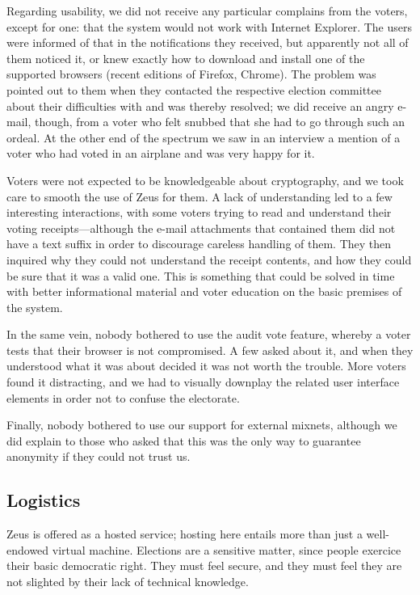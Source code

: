 \documentclass[letterpaper,10pt]{article}
\begin{document}
Regarding usability, we did not receive any particular complains from
the voters, except for one: that the system would not work with
Internet Explorer. The users were informed of that in the
notifications they received, but apparently not all of them noticed
it, or knew exactly how to download and install one of the supported
browsers (recent editions of Firefox, Chrome). The problem was pointed
out to them when they contacted the respective election committee
about their difficulties with and was thereby resolved; we did receive
an angry e-mail, though, from a voter who felt snubbed that she had
to go through such an ordeal. At the other end of the spectrum we saw
in an interview a mention of a voter who had voted in an airplane and
was very happy for it.

Voters were not expected to be knowledgeable about cryptography, and
we took care to smooth the use of Zeus for them. A lack of
understanding led to a few interesting interactions, with some voters
trying to read and understand their voting receipts---although the
e-mail attachments that contained them did not have a text suffix in
order to discourage careless handling of them. They then inquired why
they could not understand the receipt contents, and how they could be
sure that it was a valid one. This is something that could be solved
in time with better informational material and voter education on the
basic premises of the system.

In the same vein, nobody bothered to use the audit vote feature,
whereby a voter tests that their browser is not compromised. A few
asked about it, and when they understood what it was about decided it
was not worth the trouble. More voters found it distracting, and we
had to visually downplay the related user interface elements in order
not to confuse the electorate.

Finally, nobody bothered to use our support for external mixnets,
although we did explain to those who asked that this was the only way
to guarantee anonymity if they could not trust us.

\subsection{Logistics}
\label{ssec:logistics}

Zeus is offered as a hosted service; hosting here entails more than
just a well-endowed virtual machine. Elections are a sensitive matter,
since people exercice their basic democratic right. They must feel
secure, and they must feel they are not slighted by their lack of
technical knowledge.
\end{document}
